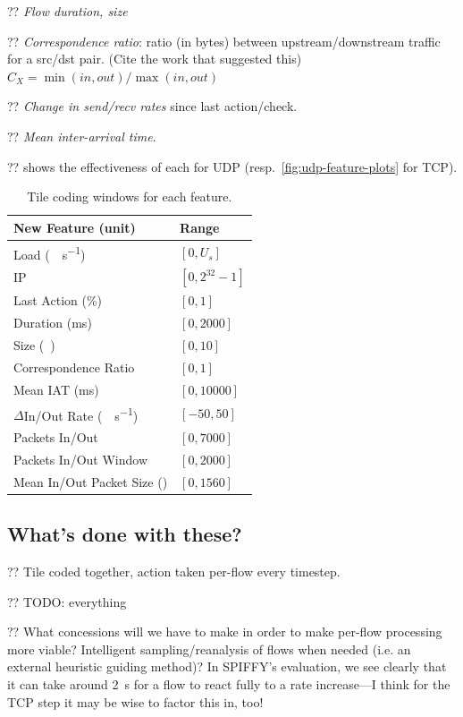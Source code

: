 \documentclass[conference, letterpaper, 10pt, times]{IEEEtran}
\begin{document}
?? \emph{Flow duration, size}

?? \emph{Correspondence ratio}: ratio (in bytes) between upstream/downstream traffic for a src/dst pair. (Cite the work that suggested this) $C_X = \min(\mathit{in}, \mathit{out})/\max(\mathit{in}, \mathit{out})$

?? \emph{Change in send/recv rates} since last action/check.

?? \emph{Mean inter-arrival time}.

??  shows the effectiveness of each for UDP (resp.\ \cref{fig:udp-feature-plots} for TCP).

\begin{table}
	\centering
	\caption{Tile coding windows for each feature.}
	
	\begin{tabular}{@{}ll@{}}
		\toprule
		New Feature (unit) & Range \\
		\midrule
		Load (\si{\mega\bit\per\second}) & $[0, U_s]$ \\
		IP & $[0, 2^{32}-1]$ \\
		Last Action (\si{\percent}) & $[0, 1]$ \\
		Duration (\si{\milli\second}) & $[0, \num{2000}]$ \\
		Size (\si{\mebi\byte}) & $[0,10]$ \\
		Correspondence Ratio & $[0,1]$ \\
		Mean IAT (\si{\milli\second}) & $[0, \num{10000}]$ \\
		$\Delta$In/Out Rate (\si{\mega\bit\per\second}) & $[-50, 50]$ \\
		Packets In/Out & $[0, 7000]$ \\
		Packets In/Out Window & $[0, 2000]$ \\
		Mean In/Out Packet Size (\si{\byte}) & $[0, 1560]$ \\
		\bottomrule
	\end{tabular}
\end{table}

\subsection{What's done with these?}

?? Tile coded together, action taken per-flow every timestep.

?? TODO: everything

?? What concessions will we have to make in order to make per-flow processing more viable? Intelligent sampling/reanalysis of flows when needed (i.e. an external heuristic guiding method)? In SPIFFY's \cite{DBLP:conf/ndss/KangGS16} evaluation, we see clearly that it can take around \SI{2}{\second} for a flow to react fully to a rate increase---I think for the TCP step it may be wise to factor this in, too!
\end{document}

